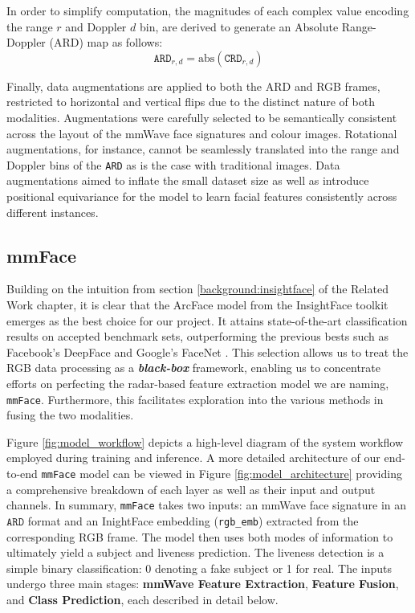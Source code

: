 \documentclass{mpaper}
\begin{document}
In order to simplify computation, the magnitudes of each complex value encoding the range $r$ and Doppler $d$ bin, are derived to generate an Absolute Range-Doppler (ARD) map as follows:
$$\mathtt{ARD}_{r\!,d} = \text{abs}(\mathtt{CRD}_{r\!,d})$$

Finally, data augmentations are applied to both the ARD and RGB frames, restricted to horizontal and vertical flips due to the distinct nature of both modalities. Augmentations were carefully selected to be semantically consistent across the layout of the mmWave face signatures and colour images. Rotational augmentations, for instance, cannot be seamlessly translated into the range and Doppler bins of the \texttt{ARD} as is the case with traditional images. Data augmentations aimed to inflate the small dataset size as well as introduce positional equivariance for the model to learn facial features consistently across different instances.


\subsection{mmFace}
Building on the intuition from section \ref{background:insightface} of the Related Work chapter, it is clear that the ArcFace model from the InsightFace toolkit emerges as the best choice for our project. It attains state-of-the-art classification results on accepted benchmark sets, outperforming the previous bests such as Facebook's DeepFace \cite{taigman2014deepface} and Google's FaceNet \cite{schroff2015facenet}. This selection allows us to treat the RGB data processing as a \textbf{\textit{black-box}} framework, enabling us to concentrate efforts on perfecting the radar-based feature extraction model we are naming, \texttt{mmFace}. Furthermore, this facilitates exploration into the various methods in fusing the two modalities. 

Figure \ref{fig:model_workflow} depicts a high-level diagram of the system workflow employed during training and inference. A more detailed architecture of our end-to-end \texttt{mmFace} model can be viewed in Figure \ref{fig:model_architecture} providing a comprehensive breakdown of each layer as well as their input and output channels. In summary, \texttt{mmFace} takes two inputs: an mmWave face signature in an $\mathtt{ARD}$ format and an InightFace embedding (\verb|rgb_emb|) extracted from the corresponding RGB frame. The model then uses both modes of information to ultimately yield a subject and liveness prediction. The liveness detection is a simple binary classification: 0 denoting a fake subject or 1 for real. The inputs undergo three main stages: \textbf{mmWave Feature Extraction}, \textbf{Feature Fusion}, and \textbf{Class Prediction}, each described in detail below.
\end{document}
